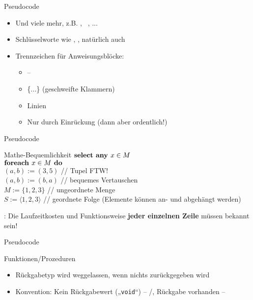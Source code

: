 \begin{frame}{Pseudocode}
	\begin{itemize}
		\large
		\item Und viele mehr, z.B. , \KwFor\ \KwEach, ...
		\item Schlüsselworte wie \KwContinue, \KwBreak,  natürlich auch
		\item Trennzeichen für Anweisungsblöcke:\\
		\begin{itemize}
			\item {} -- 
			\item \{...\} \quad  (geschweifte Klammern)
			\item Linien
			\item Nur durch Einrückung (dann aber ordentlich!)
		\end{itemize}
	\end{itemize}
\end{frame}

\begin{frame}{Pseudocode}
	\begin{exampleblock}{Mathe-Bequemlichkeit}
		$\KwSty{select any } x \in M$ \\[0,125cm]
		$\KwSty{foreach } x \in M \KwSty{ do}$ \\[0,125cm]
		$(a, b) := (3, 5)$ \quad // Tupel FTW! \smiley \\[0,125cm] 
		$(a, b) := (b, a)$ \quad // bequemes Vertauschen \\[0,125cm]
		$M := \{1, 2, 3\}$ \quad // ungeordnete Menge \\[0,125cm] %
		$S := \langle1, 2, 3\rangle$ \quad // geordnete Folge (Elemente können an- und abgehängt werden) %
	\end{exampleblock}
	: Die Laufzeitkosten und Funktionsweise \textbf{jeder einzelnen Zeile} müssen bekannt sein! \\
\end{frame}

\begin{frame}{Pseudocode}
	\begin{exampleblock}{Funktionen/Prozeduren}
		\begin{algorithm}[H]
			\DontPrintSemicolon
		\end{algorithm}
	\end{exampleblock}
	\begin{itemize}
		\item Rückgabetyp wird weggelassen, wenn nichts zurückgegeben wird
		\item Konvention: Kein Rückgabewert („\texttt{void}“) – \KwProcedure/\KwMethod, Rückgabe vorhanden – \KwFunction
	\end{itemize}
\end{frame}


